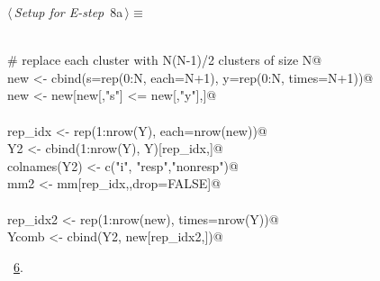 \documentclass[reqno]{amsart}
\renewcommand{\NWtarget}[2]{\hypertarget{#1}{#2}}
\renewcommand{\NWlink}[2]{\hyperlink{#1}{#2}}
\begin{document}
\begin{flushleft} \small\label{scrap9}\raggedright\small
\NWtarget{nuweb8a}{} $\langle\,${\itshape Setup for E-step}\nobreak\ {\footnotesize {8a}}$\,\rangle\equiv$
\vspace{-1ex}
\begin{list}{}{} \item
\mbox{}\verb@@\\
\mbox{}\verb@    # replace each cluster with N(N-1)/2 clusters of size N@\\
\mbox{}\verb@    new <- cbind(s=rep(0:N, each=N+1), y=rep(0:N, times=N+1))@\\
\mbox{}\verb@    new <- new[new[,"s"] <= new[,"y"],]@\\
\mbox{}\verb@@\\
\mbox{}\verb@    rep_idx <- rep(1:nrow(Y), each=nrow(new))@\\
\mbox{}\verb@    Y2 <- cbind(1:nrow(Y), Y)[rep_idx,]@\\
\mbox{}\verb@    colnames(Y2) <- c("i", "resp","nonresp")@\\
\mbox{}\verb@    mm2 <- mm[rep_idx,,drop=FALSE]@\\
\mbox{}\verb@@\\
\mbox{}\verb@    rep_idx2 <- rep(1:nrow(new), times=nrow(Y))@\\
\mbox{}\verb@    Ycomb <- cbind(Y2, new[rep_idx2,])@\\
\mbox{}\verb@@{\NWsep}
\end{list}
\vspace{-1.5ex}
\footnotesize
\begin{list}{}{\setlength{\itemsep}{-\parsep}\setlength{\itemindent}{-\leftmargin}}
\item \NWtxtMacroRefIn\ \NWlink{nuweb6}{6}.

\item{}
\end{list}
\vspace{4ex}
\end{flushleft}
\end{document}
